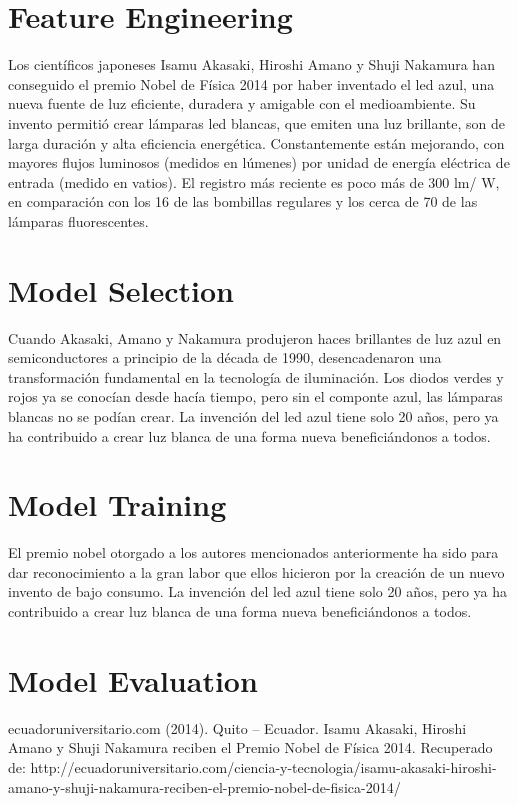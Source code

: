 \documentclass{article}
\begin{document}
\section{Feature Engineering}
Los científicos japoneses Isamu Akasaki, Hiroshi Amano y Shuji Nakamura han conseguido el premio Nobel de Física 2014 por haber inventado el led azul, una nueva fuente de luz eficiente, duradera y amigable con el medioambiente. 
Su invento permitió crear lámparas led blancas, que emiten una luz brillante, son de larga duración y alta eficiencia energética. Constantemente están mejorando, con mayores flujos luminosos (medidos en lúmenes) por unidad de energía eléctrica de entrada (medido en vatios). El registro más reciente es poco más de 300 lm/ W, en comparación con los 16 de las bombillas regulares y los cerca de 70 de las lámparas fluorescentes.
\section{Model Selection}
Cuando Akasaki, Amano y Nakamura produjeron haces brillantes de luz azul en semiconductores a principio de la década de 1990, desencadenaron una transformación fundamental en la tecnología de iluminación. Los diodos verdes y rojos ya se conocían desde hacía tiempo, pero sin el componte azul, las lámparas blancas no se podían crear. La invención del led azul tiene solo 20 años, pero ya ha contribuido a crear luz blanca de una forma nueva beneficiándonos a todos.

\section{Model Training}
El premio nobel otorgado a los autores mencionados anteriormente ha sido para dar reconocimiento a la gran labor que ellos hicieron por la creación de un nuevo invento de bajo consumo. La invención del led azul tiene solo 20 años, pero ya ha contribuido a crear luz blanca de una forma nueva beneficiándonos a todos.



\section{Model Evaluation}
ecuadoruniversitario.com  (2014). Quito – Ecuador. Isamu Akasaki, Hiroshi Amano y Shuji Nakamura reciben el Premio Nobel de Física 2014.  Recuperado de: http://ecuadoruniversitario.com/ciencia-y-tecnologia/isamu-akasaki-hiroshi-amano-y-shuji-nakamura-reciben-el-premio-nobel-de-fisica-2014/\\
\end{document}
